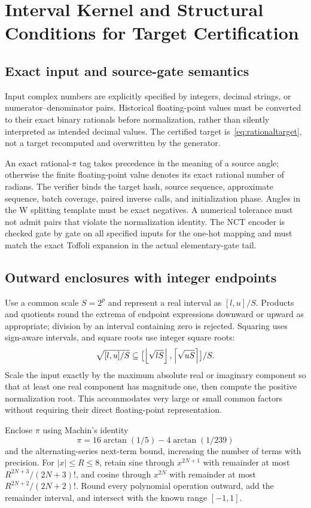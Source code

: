 \section{Interval Kernel and Structural Conditions for Target Certification}\label{app:intervals}
\subsection{Exact input and source-gate semantics}
Input complex numbers are explicitly specified by integers, decimal strings, or numerator--denominator pairs. Historical floating-point values must be converted to their exact binary rationals before normalization, rather than silently interpreted as intended decimal values. The certified target is~\eqref{eq:rationaltarget}, not a target recomputed and overwritten by the generator.

An exact rational-$\pi$ tag takes precedence in the meaning of a source angle; otherwise the finite floating-point value denotes its exact rational number of radians. The verifier binds the target hash, source sequence, approximate sequence, batch coverage, paired inverse calls, and initialization phase. Angles in the W splitting template must be exact negatives. A numerical tolerance must not admit pairs that violate the normalization identity. The NCT encoder is checked gate by gate on all specified inputs for the one-hot mapping and must match the exact Toffoli expansion in the actual elementary-gate tail.

\subsection{Outward enclosures with integer endpoints}
Use a common scale $S=2^p$ and represent a real interval as $[l,u]/S$. Products and quotients round the extrema of endpoint expressions downward or upward as appropriate; division by an interval containing zero is rejected. Squaring uses sign-aware intervals, and square roots use integer square roots:
\[
\sqrt{[l,u]/S}\subseteq
\bigl[\left\lfloor \sqrt{lS}\right\rfloor,\left\lceil \sqrt{uS}\right\rceil\bigr]/S.
\]
Scale the input exactly by the maximum absolute real or imaginary component so that at least one real component has magnitude one, then compute the positive normalization root. This accommodates very large or small common factors without requiring their direct floating-point representation.

Enclose $\pi$ using Machin's identity
\[
\pi=16\arctan(1/5)-4\arctan(1/239)
\]
and the alternating-series next-term bound, increasing the number of terms with precision. For $|x|\le R\le8$, retain sine through $x^{2N+1}$ with remainder at most $R^{2N+3}/(2N+3)!$, and cosine through $x^{2N}$ with remainder at most $R^{2N+2}/(2N+2)!$. Round every polynomial operation outward, add the remainder interval, and intersect with the known range $[-1,1]$.

